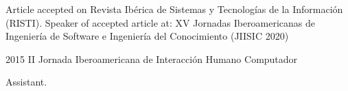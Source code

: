 \documentclass[american]{cv-class}
\begin{document}
\begin{entrylist}
	{Article accepted on Revista Ibérica de Sistemas y Tecnologías de la Información (RISTI). Speaker of accepted article at: XV Jornadas Iberoamericanas de Ingeniería de Software e Ingeniería del Conocimiento (JIISIC 2020) \\
	{\href{https://bit.ly/36BxP2W}{}}
	}
	
	\entry
	{2015}
	{II Jornada Iberoamericana de Interacción Humano Computador}
	{}
	{Assistant.
		    
	{\href{https://bit.ly/2UiQBGx}{}}
	}
\end{entrylist}
\end{document}
